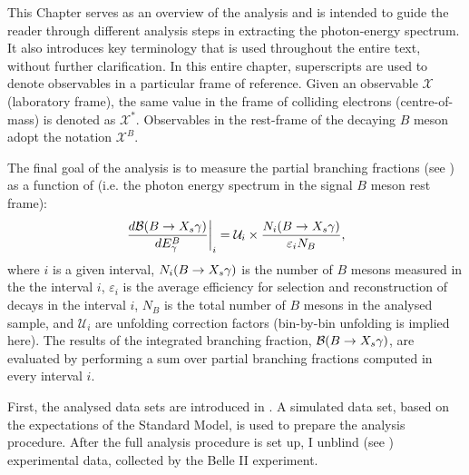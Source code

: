 This Chapter serves as an overview of the analysis
and is intended to guide the reader through different analysis steps in extracting the \BtoXsgamma photon-energy spectrum.
It also introduces key terminology that is used throughout the entire text, without further clarification.
In this entire chapter, superscripts are used to denote observables in a particular frame of reference.
Given an observable $\mathcal{X}$ (laboratory frame), the same value in the frame of colliding electrons (centre-of-mass) is denoted as $\mathcal{X}^*$.
Observables in the rest-frame of the decaying $B$ meson adopt the notation $\mathcal{X}^B$.

The final goal of the analysis is to measure the partial branching fractions (see )
as a function of \EB (i.e. the photon energy spectrum in the signal $B$ meson rest frame):
\begin{equation}\label{eq:branching_fraction_recipe}
    \left.\frac{d\mathcal{B}(\BtoXsgamma)}{d\EB}\right|_i = \mathcal{U}_i \times \frac{N_i(\BtoXsgamma)}{\varepsilon_i N_{B}},
\end{equation}
where $i$ is a given \EB interval,
$N_i(\BtoXsgamma)$ is the number of $B$ mesons measured in the the interval $i$, 
$\varepsilon_i$ is the average efficiency for selection and reconstruction of \BtoXsgamma decays in the interval $i$,
$N_B$ is the total number of $B$ mesons in the analysed sample,
and $\mathcal{U}_i$ are unfolding correction factors (bin-by-bin unfolding is implied here).
The results of the integrated branching fraction, $\mathcal{B}(\BtoXsgamma)$, are evaluated by performing a sum over partial branching fractions computed in every interval $i$.

First, the analysed data sets are introduced in .
A simulated data set, based on the expectations of the Standard Model, is used to prepare the analysis procedure.
After the full analysis procedure is set up, I unblind (see ) experimental data, collected by the Belle II experiment.

